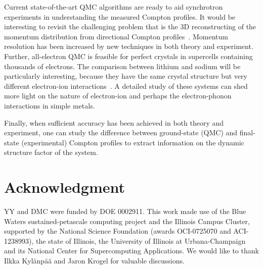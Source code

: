 \documentclass[aps,prb,showpacs,preprintnumbers,amsmath,amssymb,superscriptaddress,twocolumn]{revtex4-1}
\begin{document}
Current state-of-the-art QMC algorithms are ready to aid synchrotron experiments in understanding the measured Compton profiles. It would be interesting to revisit the challenging problem that is the 3D reconstructing of the momentum distribution from directional Compton profiles~\cite{Schulke1996,Tanaka2001}. Momentum resolution has been increased by new techniques in both theory and experiment. Further, all-electron QMC is feasible for perfect crystals in supercells containing thousands of electrons. The comparison between lithium and sodium will be particularly interesting, because they have the same crystal structure but very different electron-ion interactions~\cite{P.EisenbergerL.LamP.M.Platzman1972}. A detailed study of these systems can shed more light on the nature of electron-ion and perhaps the electron-phonon interactions in simple metals.

Finally, when sufficient accuracy has been achieved in both theory and experiment, one can study the difference between ground-state (QMC) and final-state (experimental) Compton profiles to extract information on the dynamic structure factor of the system.

\section{Acknowledgment}

YY and DMC were funded by DOE 0002911. This work made use of the Blue Waters sustained-petascale computing project and the Illinois Campus Cluster, supported by the National Science Foundation (awards OCI-0725070 and ACI-1238993), the state of Illinois, the University of Illinois at Urbana-Champaign and its National Center for Supercomputing Applications.
We would like to thank Ilkka Kyl\"anp\"a\"a and Jaron Krogel for valuable discussions.



\end{document}
